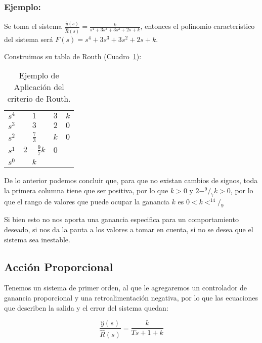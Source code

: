         \subsubsection{Ejemplo:}
            Se toma el sistema $\frac{\hat{y}(s)}{\hat{R}(s)} = \frac{k}{s^4 + 3 s^3 + 3 s^2 + 2 s + k}$, entonces el polinomio característico del sistema será $F(s) = s^4 + 3 s^3 + 3 s^2 + 2 s + k$.

            Construimos su tabla de Routh (Cuadro~\ref{tab:EjemploAplicacion}):

            \begin{table}[htbp]
                \centering
                \begin{tabular}{c|c c c}
                $s^4$ & $1$ & $3$ & $k$ \\
                $s^3$ & $3$ & $2$ & $0$ \\
                $s^2$ & $\frac{7}{3}$ & $k$ & $0$ \\
                $s^1$ & $2 - \frac{9}{7} k$ & $0$ \\
                $s^0$ & $k$
                \end{tabular}
                \caption{\label{tab:EjemploAplicacion}Ejemplo de Aplicación del criterio de Routh.}
            \end{table}

            De lo anterior podemos concluir que, para que no existan cambios de signos, toda la primera columna tiene que ser positiva, por lo que $k > 0$ y  $2 - ^9/_7 k > 0$, por lo que el rango de valores que puede ocupar la ganancia $k$ es $0 < k < ^{14}/_9$

            Si bien esto no nos aporta una ganancia especifica para un comportamiento deseado, si nos da la pauta a los valores a tomar en cuenta, si no se desea que el sistema sea inestable.

    \subsection{Acción Proporcional}
        Tenemos un sistema de primer orden, al que le agregaremos un controlador de ganancia proporcional y una retroalimentación negativa, por lo que las ecuaciones que describen la salida y el error del sistema quedan:

    \begin{equation}
        \frac{\hat{y}(s)}{\hat{R}(s)} = \frac{k}{Ts + 1 + k}
    \end{equation}

